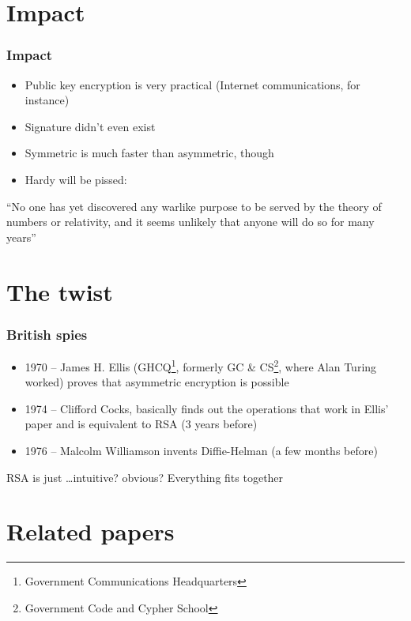 \documentclass{beamer}
\begin{document}
\section{Impact}

\begin{frame}
	\frametitle{Impact}

	\begin{itemize}
		\item Public key encryption is very practical (Internet
		      communications, for instance)
		\item Signature didn't even exist
		\item Symmetric is much faster than asymmetric, though
		\item Hardy will be pissed:
	\end{itemize}

	\begin{exampleblock}{}
		``No one has yet discovered any warlike purpose to be served
		by the theory of numbers or relativity, and it seems
		unlikely that anyone will do so for many years''
	\end{exampleblock}
\end{frame}

\section{The twist}

\begin{frame}
	\frametitle{British spies}

	\begin{itemize}
		\item 1970 -- James H. Ellis (GHCQ\footnote{Government
		      Communications Headquarters}, formerly GC \&
		      CS\footnote{Government Code and Cypher School}, where
		      Alan Turing worked) proves that asymmetric encryption is
		      possible
		\item 1974 -- Clifford Cocks, basically finds out the
		      operations that work in Ellis' paper and is equivalent
		      to RSA (3 years before)
		\item 1976 -- Malcolm Williamson invents Diffie-Helman (a
		      few months before)
	\end{itemize}

	RSA is just \ldots intuitive? obvious? Everything fits together
\end{frame}

\section{Related papers}
\end{document}
